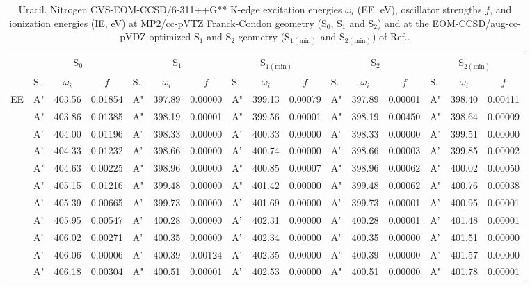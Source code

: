 \documentclass[journal=jctcce,manuscript=article]{achemso}
\begin{document}
\begin{table}
\caption{Uracil.  Nitrogen CVS-EOM-CCSD/6-311++G** K-edge excitation energies $\omega_i$ (EE, eV), oscillator strengths $f$, and ionization energies (IE, eV) at MP2/cc-pVTZ Franck-Condon geometry (S$_0$, S$_1$ and S$_2$) and at the EOM-CCSD/aug-cc-pVDZ optimized S$_1$ and S$_2$ geometry (S$_{1(\text{min})}$ and S$_{2(\text{min})}$) of Ref..
\label{Tab:Uracil}}
\scriptsize
\begin{tabular}{l|lcc|lcc|lcc|lcc|lcc}
\cline{2-16}
& \multicolumn{3}{c|}{S$_0$}
& \multicolumn{3}{c|}{S$_1$}  
& \multicolumn{3}{c|}{S$_{1(\text{min})}$}
& \multicolumn{3}{c|}{S$_2$}
& \multicolumn{3}{c}{S$_{2(\text{min})}$}
\\
\cline{2-16}
& S. & $\omega_i$ & $f$ 
& S. & $\omega_i$ & $f$ 
& S. & $\omega_i$ & $f$ 
& S. & $\omega_i$ & $f$ 
& S. & $\omega_i$ & $f$\\
\hline
  EE 
& A" & 403.56 & 0.01854 & A" & 397.89 & 0.00000 & A" & 399.13 & 0.00079 & A" & 397.89 & 0.00001 & A" & 398.40 & 0.00411 \\
& A" & 403.86 & 0.01385 & A" & 398.19 & 0.00001 & A" & 399.56 & 0.00001 & A" & 398.19 & 0.00450 & A" & 398.64 & 0.00009 \\
& A' & 404.00 & 0.01196 & A' & 398.33 & 0.00000 & A' & 400.33 & 0.00000 & A' & 398.33 & 0.00000 & A' & 399.51 & 0.00000 \\
& A' & 404.33 & 0.01232 & A' & 398.66 & 0.00000 & A' & 400.74 & 0.00000 & A' & 398.66 & 0.00003 & A' & 399.85 & 0.00002 \\
& A" & 404.63 & 0.00225 & A" & 398.96 & 0.00000 & A" & 400.85 & 0.00007 & A" & 398.96 & 0.00062 & A" & 400.02 & 0.00050 \\
& A" & 405.15 & 0.01216 & A" & 399.48 & 0.00000 & A" & 401.42 & 0.00000 & A" & 399.48 & 0.00062 & A" & 400.76 & 0.00038 \\
& A' & 405.39 & 0.00665 & A' & 399.73 & 0.00000 & A' & 401.69 & 0.00000 & A' & 399.73 & 0.00001 & A' & 400.95 & 0.00001 \\
& A' & 405.95 & 0.00547 & A' & 400.28 & 0.00000 & A' & 402.31 & 0.00000 & A' & 400.28 & 0.00001 & A' & 401.48 & 0.00001 \\
& A' & 406.02 & 0.00271 & A' & 400.35 & 0.00000 & A' & 402.34 & 0.00000 & A' & 400.35 & 0.00000 & A' & 401.51 & 0.00000 \\
& A' & 406.06 & 0.00006 & A' & 400.39 & 0.00124 & A' & 402.35 & 0.00000 & A' & 400.39 & 0.00000 & A' & 401.57 & 0.00000 \\
& A" & 406.18 & 0.00304 & A" & 400.51 & 0.00001 & A' & 402.53 & 0.00000 & A" & 400.51 & 0.00000 & A" & 401.78 & 0.00001 \\

\end{tabular}
\end{table}
\end{document}
